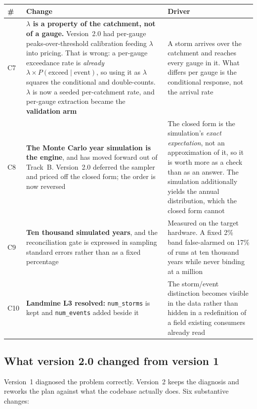 \documentclass[11pt]{article}
\begin{document}
\begin{longtable}{@{}p{}p{}p{}@{}}
\toprule
\textbf{\#} & \textbf{Change} & \textbf{Driver} \\
\midrule
\endhead
C7 & \textbf{$\lambda$ is a property of the catchment, not of a gauge.}
Version~2.0 had per-gauge peaks-over-threshold calibration feeding $\lambda$
into pricing. That is wrong: a per-gauge exceedance rate is \emph{already}
$\lambda \times P(\text{exceed} \mid \text{event})$, so using it as $\lambda$
squares the conditional and double-counts. $\lambda$ is now a seeded
per-catchment rate, and per-gauge extraction became the \textbf{validation
arm} & A storm arrives over the catchment and reaches every gauge in it. What
differs per gauge is the conditional response, not the arrival rate \\
\addlinespace
C8 & \textbf{The Monte Carlo year simulation is the engine}, and has moved
forward out of Track~B. Version~2.0 deferred the sampler and priced off the
closed form; the order is now reversed & The closed form is the simulation's
\emph{exact expectation}, not an approximation of it, so it is worth more as a
check than as an answer. The simulation additionally yields the annual
distribution, which the closed form cannot \\
\addlinespace
C9 & \textbf{Ten thousand simulated years}, and the reconciliation gate is
expressed in sampling standard errors rather than as a fixed percentage &
Measured on the target hardware. A fixed 2\% band false-alarmed on 17\% of runs
at ten thousand years while never binding at a million \\
\addlinespace
C10 & \textbf{Landmine L3 resolved:} \texttt{num\_storms} is kept and
\texttt{num\_events} added beside it & The storm/event distinction becomes
visible in the data rather than hidden in a redefinition of a field existing
consumers already read \\
\bottomrule
\end{longtable}

\subsection{What version 2.0 changed from version 1}

Version~1 diagnosed the problem correctly. Version~2 keeps the diagnosis and
reworks the plan against what the codebase actually does. Six substantive
changes:
\end{document}
